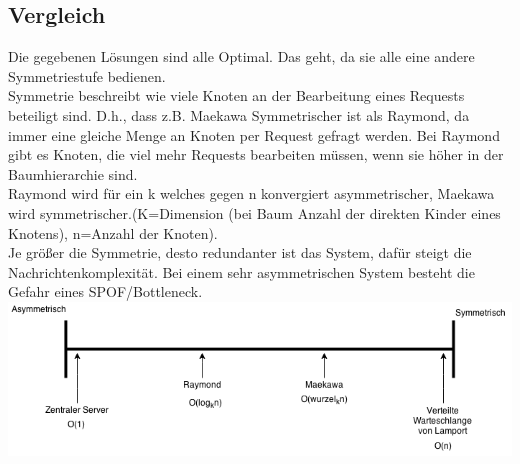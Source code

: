 \documentclass[a4paper]{article}
\begin{document}
\subsection{Vergleich}
Die gegebenen Lösungen sind alle Optimal. Das geht, da sie alle eine andere Symmetriestufe bedienen. \\
Symmetrie beschreibt wie viele Knoten an der Bearbeitung eines Requests beteiligt sind. D.h., dass z.B. Maekawa Symmetrischer ist als Raymond, da immer eine gleiche Menge an Knoten per Request gefragt werden. Bei Raymond gibt es Knoten, die viel mehr Requests bearbeiten müssen, wenn sie höher in der Baumhierarchie sind.\\
Raymond wird für ein k welches gegen n konvergiert asymmetrischer, Maekawa wird symmetrischer.(K=Dimension (bei Baum Anzahl der direkten Kinder eines Knotens), n=Anzahl der Knoten).\\
Je größer die Symmetrie, desto redundanter ist das System, dafür steigt die Nachrichtenkomplexität. Bei einem sehr asymmetrischen System besteht die Gefahr eines SPOF/Bottleneck.\\
\includegraphics[scale=0.5]{Asymmetrisch.png}\\
\end{document}
